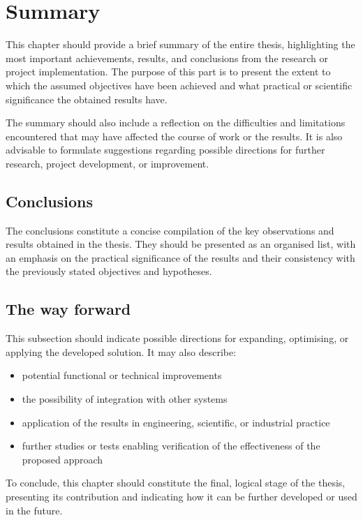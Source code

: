 \chapter{Summary}\label{chapter:4_Summary}
This chapter should provide a brief summary of the entire thesis, highlighting the most important achievements, results, and conclusions from the research or project implementation. The purpose of this part is to present the extent to which the assumed objectives have been achieved and what practical or scientific significance the obtained results have.

The summary should also include a reflection on the difficulties and limitations encountered that may have affected the course of work or the results. It is also advisable to formulate suggestions regarding possible directions for further research, project development, or improvement.

\section{Conclusions}
The conclusions constitute a concise compilation of the key observations and results obtained in the thesis. They should be presented as an organised list, with an emphasis on the practical significance of the results and their consistency with the previously stated objectives and hypotheses.

\section{The way forward}
\noindent This subsection should indicate possible directions for expanding, optimising, or applying the developed solution. It may also describe:
\begin{itemize}
    \item potential functional or technical improvements
    \item the possibility of integration with other systems
    \item application of the results in engineering, scientific, or industrial practice
    \item further studies or tests enabling verification of the effectiveness of the proposed approach
\end{itemize}

\noindent To conclude, this chapter should constitute the final, logical stage of the thesis, presenting its contribution and indicating how it can be further developed or used in the future.
